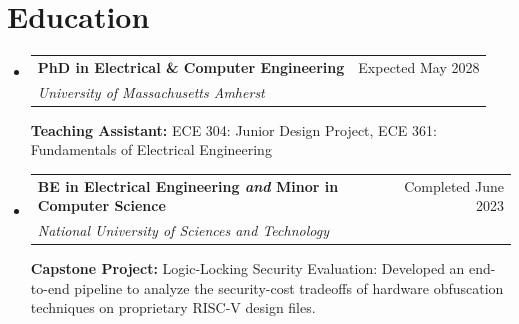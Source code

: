 \documentclass[letterpaper,11pt]{article}
\makeatletter
\newcommand{\resumeSubheading}[4]{%
  \vspace{-2pt}\item
  \begin{tabular*}{0.989\textwidth}[t]{l@{\extracolsep{\fill}}r}
    \textbf{#1} & #2 \\
    \textit{\small #3} & \textit{\small #4} \\
  \end{tabular*}\vspace{-7pt}%
}
\newcommand{\resumeSubHeadingListStart}{\begin{itemize}[leftmargin=0.15in,label={},left=0pt]}
\newcommand{\resumeSubHeadingListEnd}{\end{itemize}}
\makeatother
\begin{document}
\section{Education}
  \resumeSubHeadingListStart
    \resumeSubheading
      {PhD in Electrical \& Computer Engineering}{Expected May 2028}
      {University of Massachusetts Amherst}{\vspace{7pt}}
      { \hspace*{1em}\small \textbf{Teaching Assistant:} ECE 304: Junior Design Project, ECE 361: Fundamentals of Electrical Engineering }
      \vspace{-4pt}
    \resumeSubheading
      {BE in Electrical Engineering \textit{and} Minor in Computer Science}{Completed June 2023}
      {National University of Sciences and Technology}{\vspace{7pt}}
      { \hspace*{1em}\small \textbf{Capstone Project:} Logic-Locking Security Evaluation: Developed an end-to-end pipeline to analyze the security-cost tradeoffs of hardware obfuscation techniques on proprietary RISC-V design files. }
      \vspace{-4pt}
  \resumeSubHeadingListEnd
\end{document}
